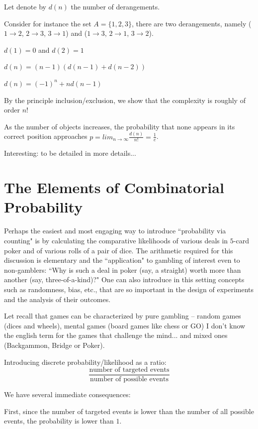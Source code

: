 Let denote by $d(n)$ the number of derangements.
\medskip

Consider for instance the set $A = \{1,2,3 \}$, there are two derangements, namely
($1 \rightarrow 2$, $2 \rightarrow 3$, $3 \rightarrow 1$)
and 
($1 \rightarrow 3$, $2 \rightarrow 1$, $3 \rightarrow 2$).
\medskip

$d(1) = 0$ and $d(2) = 1$

$d(n) = (n-1) (d(n-1) + d(n-2))$

$d(n) = (-1)^n + n d(n-1)$
\bigskip

By the principle inclusion/exclusion, we show that the complexity is roughly of order $n!$

As the number of objects increases, the probability that none appears in its correct position approaches
$p=lim_{n \rightarrow \infty}\frac{d(n)}{n!}=\frac{1}{e}$. 

{\Denis Interesting: to be detailed in more details...}


\section{The Elements of Combinatorial Probability}

Perhaps the easiest and most engaging way to introduce ``probability
via counting" is by calculating the comparative likelihoods of various
deals in $5$-card poker and of various rolls of a pair of dice.  The
arithmetic required for this discussion is elementary and the
``application" to gambling of interest even to non-gamblers: ``Why is
such a deal in poker (say, a straight) worth more than another (say,
three-of-a-kind)?"  One can also introduce in this setting concepts
such as randomness, bias, etc., that are so important in the design of
experiments and the analysis of their outcomes.

Let recall that games can be characterized by pure gambling -- random games (dices and wheels), 
mental games (board games like chess or GO)
 {\Denis I don't know the english term for the games that challenge the mind...} 
and mixed ones (Backgammon, Bridge or Poker).
\medskip

Introducing discrete probability/likelihood as a ratio:
\[ 
\frac{\mbox{number of targeted events}}{\mbox{number of possible events}}
\]

We have several immediate consequences:

First, since the number of targeted events is lower than the number of all possible events,
the probability is lower than $1$. 

